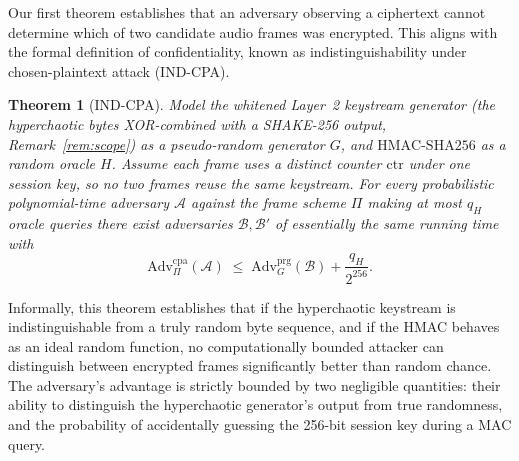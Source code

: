 \documentclass[pdflatex,sn-mathphys-num]{sn-jnl}%
\theoremstyle{thmstyleone}%
\newtheorem{theorem}{Theorem}%
\theoremstyle{thmstyletwo}%
\theoremstyle{thmstylethree}%
\begin{document}
Our first theorem establishes that an adversary observing a ciphertext cannot determine which of two candidate audio frames was encrypted. This aligns with the formal definition of confidentiality, known as indistinguishability under chosen-plaintext attack (IND-CPA).

\begin{theorem}[IND-CPA]
\label{thm:indcpa}
Model the whitened Layer~2 keystream generator (the hyperchaotic bytes XOR-combined with a SHAKE-256 output, Remark~\ref{rem:scope}) as a pseudo-random generator $G$, and $\mathrm{HMAC\text{-}SHA256}$ as a random oracle $H$. Assume each frame uses a distinct counter $\mathrm{ctr}$ under one session key, so no two frames reuse the same keystream. For every probabilistic polynomial-time adversary $\mathcal{A}$ against the frame scheme $\Pi$ making at most $q_H$ oracle queries there exist adversaries $\mathcal{B},\mathcal{B}'$ of essentially the same running time with
\[
\mathrm{Adv}^{\mathrm{cpa}}_{\Pi}(\mathcal{A}) \;\le\; \mathrm{Adv}^{\mathrm{prg}}_{G}(\mathcal{B}) + \frac{q_H}{2^{256}}.
\]
\end{theorem}

Informally, this theorem establishes that if the hyperchaotic keystream is indistinguishable from a truly random byte sequence, and if the HMAC behaves as an ideal random function, no computationally bounded attacker can distinguish between encrypted frames significantly better than random chance. The adversary's advantage is strictly bounded by two negligible quantities: their ability to distinguish the hyperchaotic generator's output from true randomness, and the probability of accidentally guessing the 256-bit session key during a MAC query.
\end{document}
